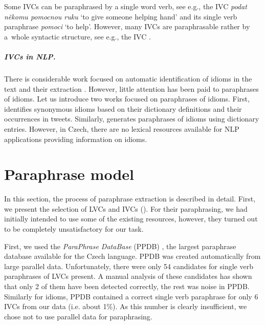 \documentclass[output=paper
,modfonts
,nonflat]{langsci/langscibook}
\begin{document}
Some IVCs can be paraphrased by a single word verb, see e.g., the IVC 
\textit{podat někomu pomocnou ruku} `to give someone helping hand' and its 
single verb paraphrase \textit{pomoci} `to help'. However, many IVCs are 
paraphrasable rather by a~whole syntactic structure, see e.g., the IVC 
.

 \subparagraph*{IVCs in NLP.} There is considerable work focused on automatic 
identification of idioms in the text and their extraction
\citep{cook-07,li-2009,muzny2013,peng-15,Katz06automaticidentification}. 
However, little attention has been paid to paraphrases of idioms. Let us 
introduce two works focused on paraphrases of idioms. First, \citet{pershina-15} 
identifies synonymous idioms based on their dictionary definitions  and their 
occurrences in tweets. Similarly, \citet{liu2016phrasal} generates paraphrases 
of idioms using  dictionary entries. However, in Czech, there are no lexical
resources available for NLP applications providing information on idioms. 


\section{Paraphrase model}
\label{CPs}


In this section, the process of paraphrase extraction is described in detail. 
First, we present the selection of LVCs and IVCs (). For 
their paraphrasing, we had initially intended to use some of the existing 
resources, however, they turned out to be completely unsatisfactory for 
our task.

First, we used the \emph{ParaPhrase DataBase} (PPDB) \citep{ppdb}, 
the largest paraphrase database available for the Czech language. PPDB was 
created automatically from large parallel data. Unfortunately, there were only 
54 candidates for single verb paraphrases of LVCs present. A manual analysis of 
these candidates has shown that only 2 of them have been detected correctly, the 
rest was noise in PPDB. Similarly for idioms, PPDB contained a correct single 
verb paraphrase for only 6 IVCs from our data (i.e. about 1\%). As this number 
is clearly insufficient, we chose not to use parallel data for paraphrasing.
\end{document}
